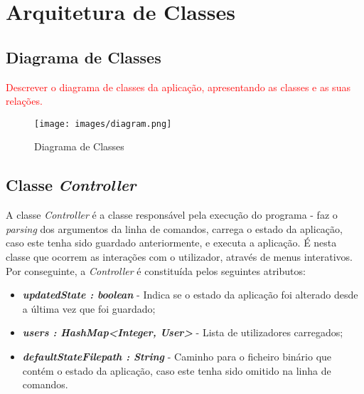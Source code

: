 \documentclass[a4paper,12pt]{scrreprt}
\begin{document}
\pagebreak

%
%
%




\chapter{Arquitetura de Classes}
\section{Diagrama de Classes}
\textcolor{red}{
    Descrever o diagrama de classes da aplicação, apresentando as classes e as suas relações.
}


\begin{figure}[!ht]
    \centering
    \texttt{[image: images/diagram.png]}
    \caption{Diagrama de Classes}
    \label{fig:diagrama-classes}
\end{figure}


\section{Classe \textit{Controller}}
    A classe \textit{Controller} é a classe responsável pela execução do programa - faz o \textit{parsing} dos argumentos da linha de comandos, carrega o estado da aplicação, caso este tenha sido guardado anteriormente, e executa a aplicação.
    É nesta classe que ocorrem as interações com o utilizador, através de menus interativos.
    Por conseguinte, a \textit{Controller} é constituída pelos seguintes atributos:

    \begin{itemize}
        \item \textit{\textbf{updatedState : boolean}} - Indica se o estado da aplicação foi alterado desde a última vez que foi guardado;
        \item \textit{\textbf{users : HashMap<Integer, User>}} - Lista de utilizadores carregados;
        \item \textit{\textbf{defaultStateFilepath : String}} - Caminho para o ficheiro binário que contém o estado da aplicação, caso este tenha sido omitido na linha de comandos.
    \end{itemize}
\end{document}
